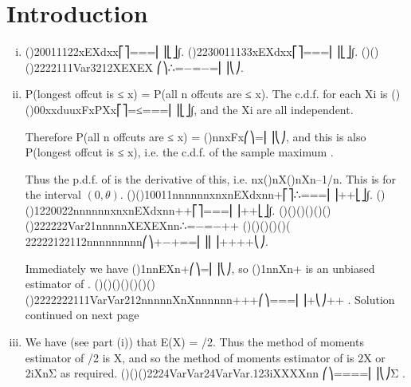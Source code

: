 \documentclass{article}
\author{kobriendublin }
\date{December 2018}
\begin{document}
\section{Introduction}
\begin{enumerate}[(i)]
\item  ()20011122xEXdxx\theta\theta\theta\theta\theta⎡⎤===⎢⎥⎣⎦∫.
           ()2230011133xEXdxx\theta\theta \theta\theta\theta⎡⎤===⎢⎥⎣⎦∫.
           ()()(){}2222111Var3212XEXEX \theta\theta\theta⎛⎞∴=−=−=⎜⎟⎝⎠.
\item  P(longest offcut is ≤ x) = P(all n offcuts are ≤ x).
           The c.d.f. for each Xi is ()()00xxduuxFxPXx\theta\theta\theta⎡⎤=≤===⎢⎥⎣⎦∫, and the Xi are all independent. 
          
Therefore P(all n offcuts are ≤ x) = (){}nnxFx\theta⎛⎞=⎜⎟⎝⎠, and this is also P(longest offcut is ≤ x), i.e. the c.d.f. of the sample maximum . 

Thus the p.d.f. of is the derivative of this, i.e. nx()nX()nXn–1/\theta n. 
This is for the interval $(0, \theta )$.
           ()()10011nnnnnnxnxnEXdxnn\theta\theta\theta\theta\theta+⎡⎤∴===⎢⎥++⎣⎦∫.
           ()()1220022nnnnnnxnxnEXdxnn\theta\theta \theta\theta\theta++⎡⎤===⎢⎥++⎣⎦∫.
           ()()()()()(){}()222222Var21nnnnnXEXEXnn\theta\theta∴=−=−++
             ()()()()()( 22222122112nnnnnnnnn\theta\theta⎛⎞+−+==⎜⎟⎜⎟++++⎝⎠.

Immediately we have ()1nnEXn\theta+⎛⎞=⎜⎟⎝⎠, so ()1nnXn+ is an unbiased estimator of \theta.
        ()()()()()()()()2222222111VarVar212nnnnnXnXnnnnnn\theta\theta+++⎛⎞===⎜⎟+⎝⎠++ .
        Solution continued on next page
\item  We have (see part (i)) that E(X) = \theta /2. Thus the method of moments estimator of \theta /2 is X, and so the method of moments estimator of \theta is 2X or 2iXnΣ as required.
        ()()()2224VarVar24VarVar.123iXXXXnn \theta\theta⎛⎞====⎜⎟⎝⎠Σ .
\end{enumerate}
\end{document}
